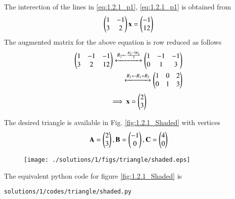 %
The interection of the lines in \eqref{eq:1.2.1_p1}, \eqref{eq:1.2.1_p1}
is obtained  from
\begin{align}
\begin{pmatrix}1 & -1\\3 & 2\end{pmatrix} \mathbf{x} = \begin{pmatrix}-1\\12\end{pmatrix}
\end{align}
%
The augmented matrix for the above equation is row reduced as follows
\begin{align}
\begin{pmatrix}1 & -1 & -1\\3 & 2 & 12\end{pmatrix} 
\xleftrightarrow {R_2\leftarrow \frac{R_2-3R_1}{5}}\begin{pmatrix}1 & -1 & -1\\0 & 1 & 3\end{pmatrix} 
\\
\xleftrightarrow {R_1\leftarrow R_1 + R_2}\begin{pmatrix}1 & 0 & 2\\0 & 1 & 3\end{pmatrix} 
\label{eq:1.2.1_line_aug}
\end{align}
%
\begin{align}
\implies \mathbf{x}=\begin{pmatrix}2\\3\end{pmatrix}
\end{align}

The desired triangle is available in Fig.  \eqref{fig:1.2.1_Shaded} with vertices
\begin{align}
\mathbf{A}=\begin{pmatrix}2\\3\end{pmatrix},
\mathbf{B}=\begin{pmatrix}-1\\0\end{pmatrix},
\mathbf{C}=\begin{pmatrix}4\\0\end{pmatrix}
\end{align}
\begin{figure}[!ht]
\texttt{[image: ./solutions/1/figs/triangle/shaded.eps]}
\caption{}
\label{fig:1.2.1_Shaded}
\end{figure}
The equivalent python code for figure \eqref{fig:1.2.1_Shaded} is
%
\begin{lstlisting}
solutions/1/codes/triangle/shaded.py
\end{lstlisting}


